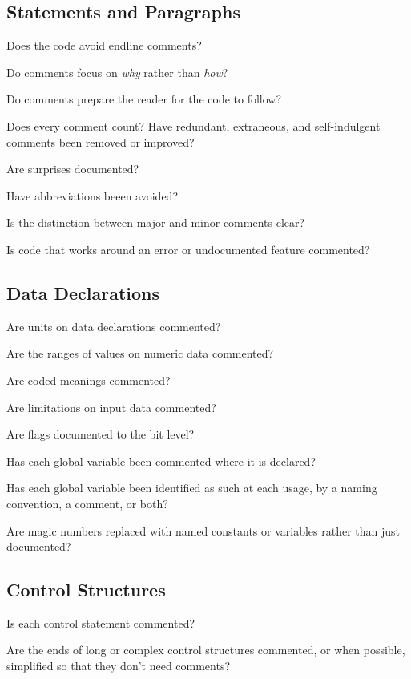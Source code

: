 \begin{multicols}{2}
\subsection*{Statements and Paragraphs}
\begin{todolist}
  \item Does the code avoid endline comments?
  \item Do comments focus on \textit{why} rather than \textit{how}?
  \item Do comments prepare the reader for the code to follow?
  \item Does every comment count? Have redundant, extraneous, and self-indulgent comments been removed or improved?
  \item Are surprises documented?
  \item Have abbreviations beeen avoided?
  \item Is the distinction between major and minor comments clear?
  \item Is code that works around an error or undocumented feature commented?
\end{todolist}

\subsection*{Data Declarations}
\begin{todolist}
  \item Are units on data declarations commented?
  \item Are the ranges of values on numeric data commented?
  \item Are coded meanings commented?
  \item Are limitations on input data commented?
  \item Are flags documented to the bit level?
  \item Has each global variable been commented where it is declared?
  \item Has each global variable been identified as such at each usage, by a naming convention, a comment, or both?
  \item Are magic numbers replaced with named constants or variables rather than just documented?
\end{todolist}

\subsection*{Control Structures}
\begin{todolist}
  \item Is each control statement commented?
  \item Are the ends of long or complex control structures commented, or when possible, simplified so that they don't need comments?
\end{todolist}


\end{multicols}
